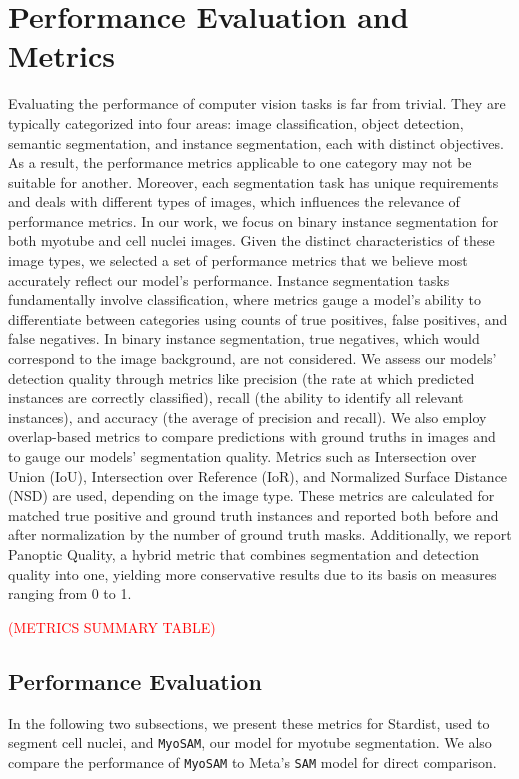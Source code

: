\section{Performance Evaluation and Metrics}
Evaluating the performance of computer vision tasks is far from trivial. They are typically categorized into four areas: image classification, object detection, semantic segmentation, and instance segmentation, each with distinct objectives. As a result, the performance metrics applicable to one category may not be suitable for another. Moreover, each segmentation task has unique requirements and deals with different types of images, which influences the relevance of performance metrics. In our work, we focus on binary instance segmentation for both myotube and cell nuclei images. Given the distinct characteristics of these image types, we selected a set of performance metrics that we believe most accurately reflect our model's performance.
Instance segmentation tasks fundamentally involve classification, where metrics gauge a model's ability to differentiate between categories using counts of true positives, false positives, and false negatives. In binary instance segmentation, true negatives, which would correspond to the image background, are not considered. We assess our models' detection quality through metrics like precision (the rate at which predicted instances are correctly classified), recall (the ability to identify all relevant instances), and accuracy (the average of precision and recall). We also employ overlap-based metrics to compare predictions with ground truths in images and to gauge our models' segmentation quality. Metrics such as Intersection over Union (IoU), Intersection over Reference (IoR), and Normalized Surface Distance (NSD) are used, depending on the image type. These metrics are calculated for matched true positive and ground truth instances and reported both before and after normalization by the number of ground truth masks. Additionally, we report Panoptic Quality, a hybrid metric that combines segmentation and detection quality into one, yielding more conservative results due to its basis on measures ranging from 0 to 1.

\textcolor{red}{(METRICS SUMMARY TABLE)}
\subsection{Performance Evaluation}
In the following two subsections, we present these metrics for Stardist, used to segment cell nuclei, and \texttt{MyoSAM}, our model for myotube segmentation. We also compare the performance of \texttt{MyoSAM} to Meta’s \texttt{SAM} model for direct comparison.
